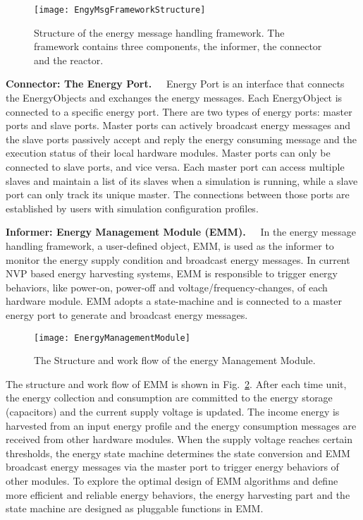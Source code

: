 \begin{figure}[!htpb]
	\centering
	\texttt{[image: EngyMsgFrameworkStructure]}
	\vspace{-5pt}
	\caption{Structure of the energy message handling framework. The framework contains three components, the informer, the connector and the reactor.}		\label{fig:EngyMsgFrameworkStructure}
	\vspace{-15pt}
\end{figure}

\textbf{Connector: The Energy Port.\ \ }
Energy Port is an interface that connects the EnergyObjects and exchanges the energy messages.
Each EnergyObject is connected to a specific energy port.
There are two types of energy ports: master ports and slave ports.
Master ports can actively broadcast energy messages and the slave ports passively accept and reply the energy consuming message and the execution status of their local hardware modules.
Master ports can only be connected to slave ports, and vice versa. 
Each master port can access multiple slaves and maintain a list of its slaves when a simulation is running, while a slave port can only track its unique master. 
The connections between those ports are established by users with simulation configuration profiles.

\textbf{Informer: Energy Management Module (EMM).\ \ }
In the energy message handling framework, a user-defined object, EMM, is used as the informer to monitor the energy supply condition and broadcast energy messages.
In current NVP based energy harvesting systems, EMM is responsible to trigger energy behaviors, like power-on, power-off and voltage/frequency-changes, of each hardware module.
EMM adopts a state-machine and is connected to a master energy port to generate and broadcast energy messages.

\begin{figure}[!htpb]
	\centering
	\vspace{-5pt}
	\texttt{[image: EnergyManagementModule]}
	\vspace{-10pt}
	\caption{The Structure and work flow of the energy Management Module.}		\label{fig:EnergyManagementModule}
\end{figure}

The structure and work flow of EMM is shown in Fig.~\ref{fig:EnergyManagementModule}.
After each time unit, the energy collection and consumption are committed to the energy storage (capacitors) and the current supply voltage is updated.
The income energy is harvested from an input energy profile and the energy consumption messages are received from other hardware modules.
When the supply voltage reaches certain thresholds, the energy state machine determines the state conversion and EMM broadcast energy messages via the master port to trigger energy behaviors of other modules.
To explore the optimal design of EMM algorithms and define more efficient and reliable energy behaviors, the energy harvesting part and the state machine are designed as pluggable functions in EMM.

